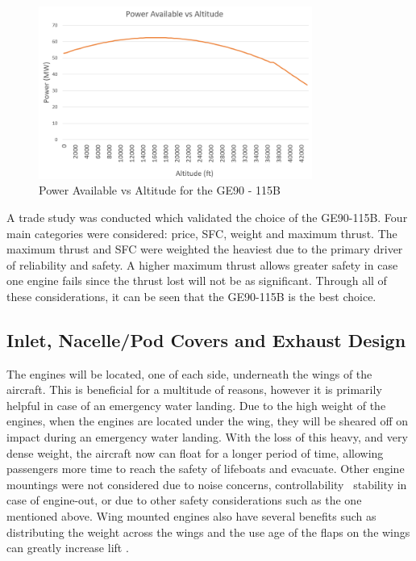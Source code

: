 \begin{figure} [h!]
    \centering
    \includegraphics[width=0.8\textwidth]{Photos/powervsaltitude.PNG}
    \caption{Power Available vs Altitude for the GE90 - 115B}
    \label{fig:poweravailable}
\end{figure}

A trade study was conducted which validated the choice of the GE90-115B. Four main categories were considered: price, SFC, weight and maximum thrust. The maximum thrust and SFC were weighted the heaviest due to the primary driver of reliability and safety. A higher maximum thrust allows greater safety in case one engine fails since the thrust lost will not be as significant. Through all of these considerations, it can be seen that the GE90-115B is the best choice.

\subsection{Inlet, Nacelle/Pod Covers and Exhaust Design}

The engines will be located, one of each side, underneath the wings of the aircraft. This is beneficial for a multitude of reasons, however it is primarily helpful in case of an emergency water landing. Due to the high weight of the engines, when the engines are located under the wing, they will be sheared off on impact during an emergency water landing. With the loss of this heavy, and very dense weight, the aircraft now can float for a longer period of time, allowing passengers more time to reach the safety of lifeboats and evacuate. Other engine mountings were not considered due to noise concerns, controllability \ stability in case of engine-out, or due to other safety considerations such as the one mentioned above. Wing mounted engines also have several benefits such as distributing the weight across the wings and the use age of the flaps on the wings can greatly increase lift \cite{raymer}.




